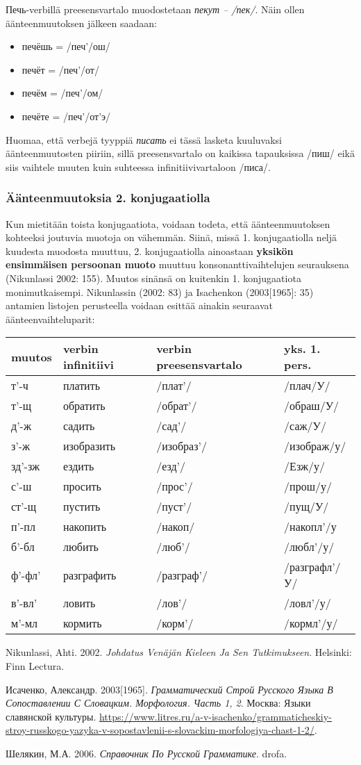\documentclass[]{scrartcl}
\providecommand{\tightlist}{%
  \setlength{\itemsep}{0pt}\setlength{\parskip}{0pt}}
\begin{document}
Печь-verbillä preesensvartalo muodostetaan \emph{пекут -- /пек/}. Näin
ollen äänteenmuutoksen jälkeen saadaan:

\begin{itemize}
\tightlist
\item
  печёшь = /печ'/ош/
\item
  печёт = /печ'/от/
\item
  печём = /печ'/ом/
\item
  печёте = /печ'/от'э/
\end{itemize}

Huomaa, että verbejä tyyppiä \emph{писать} ei tässä lasketa kuuluvaksi
äänteenmuutosten piiriin, sillä preesensvartalo on kaikissa tapauksissa
/пиш/ eikä siis vaihtele muuten kuin suhteessa infinitiivivartaloon
/писа/.

\subsubsection{Äänteenmuutoksia 2.
konjugaatiolla}\label{uxe4uxe4nteenmuutoksia-2.-konjugaatiolla}

Kun mietitään toista konjugaatiota, voidaan todeta, että
äänteenmuutoksen kohteeksi joutuvia muotoja on vähemmän. Siinä, missä 1.
konjugaatiolla neljä kuudesta muodosta muuttuu, 2. konjugaatiolla
ainoastaan \textbf{yksikön ensimmäisen persoonan muoto} muuttuu
konsonanttivaihtelujen seurauksena (Nikunlassi 2002: 155). Muutos
sinänsä on kuitenkin 1. konjugaatiota monimutkaisempi. Nikunlassin
(2002: 83) ja Isachenkon (2003{[}1965{]}: 35) antamien listojen
perusteella voidaan esittää ainakin seuraavat äänteenvaihteluparit:

\begin{longtable}[c]{@{}llll@{}}
\toprule
muutos & verbin infinitiivi & verbin preesensvartalo & yks. 1.
pers.\tabularnewline
\midrule
\endhead
т'-ч & платить & /плат'/ & /плач/У/\tabularnewline
т'-щ & обратить & /обрат'/ & /обраш/У/\tabularnewline
д'-ж & садить & /сад'/ & /саж/У/\tabularnewline
з'-ж & изобразить & /изобраз'/ & /изображ/у/\tabularnewline
зд'-зж & ездить & /езд'/ & /Езж/у/\tabularnewline
с'-ш & просить & /прос'/ & /прош/у/\tabularnewline
ст'-щ & пустить & /пуст'/ & /пущ/У/\tabularnewline
п'-пл & накопить & /накоп/ & /накопл'/у\tabularnewline
б'-бл & любить & /люб'/ & /любл'/у/\tabularnewline
ф'-фл' & разграфить & /разграф'/ & /разграфл'/У/\tabularnewline
в'-вл' & ловить & /лов'/ & /ловл'/у/\tabularnewline
м'-мл & кормить & /корм'/ & /кормл'/у/\tabularnewline
\bottomrule
\end{longtable}

Nikunlassi, Ahti. 2002. \emph{Johdatus Venäjän Kieleen Ja Sen
Tutkimukseen}. Helsinki: Finn Lectura.

Исаченко, Александр. 2003{[}1965{]}. \emph{Грамматический Строй Русского
Языка В Сопоставлении С Словацким. Морфология. Часть 1, 2}. Москва:
Языки славянской культуры.
\url{https://www.litres.ru/a-v-isachenko/grammaticheskiy-stroy-russkogo-yazyka-v-sopostavlenii-s-slovackim-morfologiya-chast-1-2/}.

Шелякин, М.А. 2006. \emph{Справочник По Русской Грамматике}. drofa.
\end{document}
